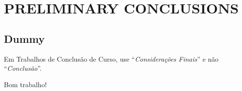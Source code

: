 \chapter{PRELIMINARY CONCLUSIONS}\label{conclusions}


\section{Dummy}\label{sec:dummy}


Em Trabalhos de Conclusão de Curso, use ``\emph{Considerações Finais}'' e não ``\emph{Conclusão}''.

Bom trabalho!

